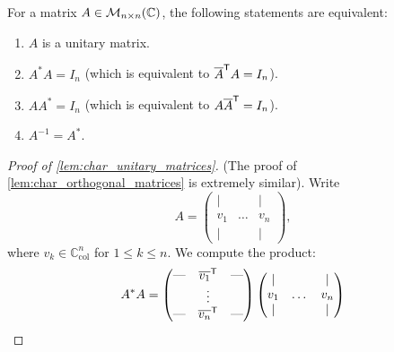 \begin{lemma}
\label{lem:char_unitary_matrices}
For a matrix $A \in \mathcal{M}_{n \times n}(\mathbb{C})$, the following statements are equivalent:
\begin{enumerate}[label=\textbf{(\alph*)}]
    \item $A$ is a unitary matrix.
    \item $A^* A = I_n$ (which is equivalent to $\overline{A}^{\mathsf{T}} A = I_n$).
    \item $A A^* = I_n$ (which is equivalent to $A \overline{A}^{\mathsf{T}} = I_n$).
    \item $A^{-1} = A^*$.
\end{enumerate}
\end{lemma}

\begin{proof}[Proof of \cref{lem:char_unitary_matrices}]
(The proof of \cref{lem:char_orthogonal_matrices} is extremely similar).
Write
\[
    A = \begin{pmatrix} | & & | \\ v_1 & \dots & v_n \\ | & & | \end{pmatrix},
\]
where $v_k \in \mathbb{C}_{\text{col}}^n$ for $1 \leq k \leq n$. We compute the product:
\begin{align}
    A^* A &= \begin{pmatrix} \text{---} & \overline{v_1}\transp & \text{---} \\ & \vdots & \\ \text{---} & \overline{v_n}\transp & \text{---} \end{pmatrix} \begin{pmatrix} | & & | \\ v_1 & \dots & v_n \\ | & & | \end{pmatrix} \nonumber \\

\end{align}
\end{proof}

